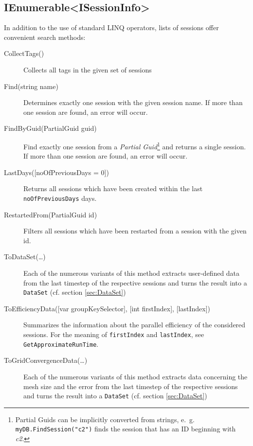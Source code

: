 \subsection{IEnumerable<ISessionInfo>}
In addition to the use of standard LINQ operators, lists of sessions offer convenient search methods:
\begin{description}
	\item[CollectTags()]
	Collects all tags in the given set of sessions

	\item[Find(string name)]
	Determines exactly one session with the given session name. If more than one session are found, an error will occur.

	\item[FindByGuid(PartialGuid guid)]
	Find exactly one session from a \emph{Partial Guid}\footnote{Partial Guids can be implicitly converted from strings, e.~g. \lstinline{myDB.FindSession("c2")} finds the session that has an ID beginning with \emph{c2}.} and returns a single session. If more than one session are found, an error will occur.
	
	\item[LastDays({[}noOfPreviousDays = 0{]})]
	Returns all sessions which have been created within the last \lstinline{noOfPreviousDays} days.
	
	\item[RestartedFrom(PartialGuid id)]
	Filters all sessions which have been restarted from a session with the given id.
	
	\item[ToDataSet(\ldots)]
	Each of the numerous variants of this method extracts user-defined data from the last timestep of the respective sessions and turns the result into a \lstinline{DataSet} (cf. section \ref{sec:DataSet})
	
	\item[ToEfficiencyData({[}var groupKeySelector{]}, {[}int firstIndex{]}, {[}lastIndex{]})]
	Summarizes the information about the parallel efficiency of the considered sessions. For the meaning of \lstinline{firstIndex} and \lstinline{lastIndex}, see \lstinline{GetApproximateRunTime}.
	
	\item[ToGridConvergenceData(\ldots)]
	Each of the numerous variants of this method extracts data concerning the mesh size and the error from the last timestep of the respective sessions and turns the result into a \lstinline{DataSet} (cf. section \ref{sec:DataSet})
	

\end{description}
